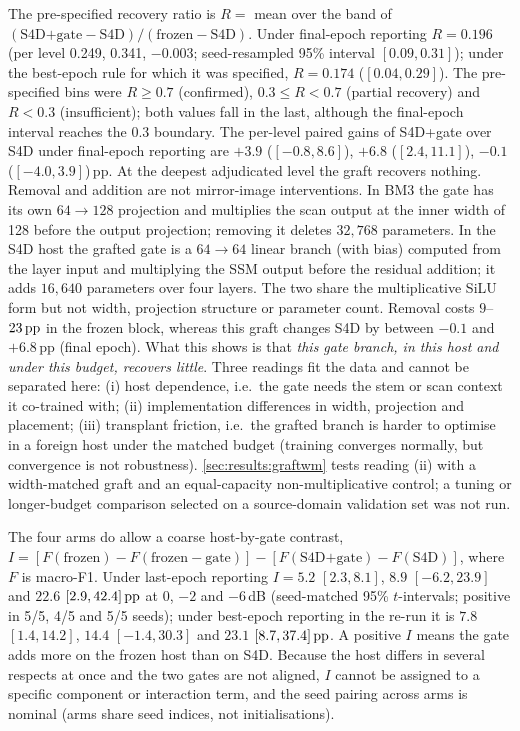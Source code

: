 The pre-specified recovery ratio is $R = $ mean over the band of $(\text{S4D+gate} - \text{S4D})/(\text{frozen} - \text{S4D})$. Under final-epoch reporting $R = \mathbf{0.196}$ (per level 0.249, 0.341, $-$0.003; seed-resampled 95\% interval $[0.09, 0.31]$); under the best-epoch rule for which it was specified, $R = 0.174$ ($[0.04, 0.29]$). The pre-specified bins were $R \geq 0.7$ (confirmed), $0.3 \leq R < 0.7$ (partial recovery) and $R < 0.3$ (insufficient); both values fall in the last, although the final-epoch interval reaches the $0.3$ boundary. The per-level paired gains of S4D+gate over S4D under final-epoch reporting are $+3.9$ ($[-0.8, 8.6]$), $+6.8$ ($[2.4, 11.1]$), $-0.1$ ($[-4.0, 3.9]$)\,pp. At the deepest adjudicated level the graft recovers nothing. Removal and addition are not mirror-image interventions. In BM3 the gate has its own $64 \rightarrow 128$ projection and multiplies the scan output at the inner width of 128 before the output projection; removing it deletes $32{,}768$ parameters. In the S4D host the grafted gate is a $64 \rightarrow 64$ linear branch (with bias) computed from the layer input and multiplying the SSM output before the residual addition; it adds $16{,}640$ parameters over four layers. The two share the multiplicative SiLU form but not width, projection structure or parameter count. Removal costs $9$--$23\,\mathrm{pp}$ in the frozen block, whereas this graft changes S4D by between $-0.1$ and $+6.8$\,pp (final epoch). What this shows is that \emph{this gate branch, in this host and under this budget, recovers little}. Three readings fit the data and cannot be separated here: (i) host dependence, i.e.\ the gate needs the stem or scan context it co-trained with; (ii) implementation differences in width, projection and placement; (iii) transplant friction, i.e.\ the grafted branch is harder to optimise in a foreign host under the matched budget (training converges normally, but convergence is not robustness). \ref{sec:results:graftwm} tests reading (ii) with a width-matched graft and an equal-capacity non-multiplicative control; a tuning or longer-budget comparison selected on a source-domain validation set was not run.

The four arms do allow a coarse host-by-gate contrast, $I = [F(\text{frozen}) - F(\text{frozen}{-}\text{gate})] - [F(\text{S4D+gate}) - F(\text{S4D})]$, where $F$ is macro-F1. Under last-epoch reporting $I = 5.2$ $[2.3, 8.1]$, $8.9$ $[-6.2, 23.9]$ and $22.6$ $[2.9, 42.4]\,\mathrm{pp}$ at $0$, $-2$ and $-6$\,dB (seed-matched 95\% $t$-intervals; positive in 5/5, 4/5 and 5/5 seeds); under best-epoch reporting in the re-run it is $7.8$ $[1.4, 14.2]$, $14.4$ $[-1.4, 30.3]$ and $23.1$ $[8.7, 37.4]\,\mathrm{pp}$. A positive $I$ means the gate adds more on the frozen host than on S4D. Because the host differs in several respects at once and the two gates are not aligned, $I$ cannot be assigned to a specific component or interaction term, and the seed pairing across arms is nominal (arms share seed indices, not initialisations).

